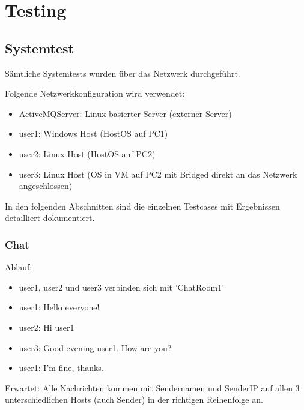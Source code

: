 \documentclass[11pt, a4paper]{article}
\begin{document}
\newpage

\section{Testing}

\subsection{Systemtest}
Sämtliche Systemtests wurden über das Netzwerk durchgeführt.

Folgende Netzwerkkonfiguration wird verwendet:
\begin{itemize}
	\item ActiveMQServer: Linux-basierter Server (externer Server)
	\item user1: Windows Host (HostOS auf PC1)
	\item user2: Linux Host (HostOS auf PC2)
	\item user3: Linux Host (OS in VM auf PC2 mit Bridged direkt an das Netzwerk angeschlossen)
\end{itemize}

In den folgenden Abschnitten sind die einzelnen Testcases mit Ergebnissen detailliert dokumentiert.

\subsubsection{Chat}
Ablauf:
\begin{itemize}
	\item user1, user2 und user3 verbinden sich mit 'ChatRoom1'
	\item user1: Hello everyone!
	\item user2: Hi user1
	\item user3: Good evening user1. How are you?
	\item user1: I'm fine, thanks.
\end{itemize}

Erwartet: Alle Nachrichten kommen mit Sendernamen und SenderIP auf allen 3 unterschiedlichen Hosts (auch Sender) in der richtigen Reihenfolge an.
\end{document}

